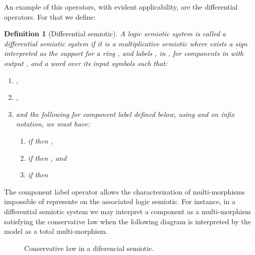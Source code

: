\documentclass[oribibl]{llncs}
\newtheorem{defn}{Definition}
\begin{document}
An example of this operators, with evident applicability, are the differential operators. For that we define:

\begin{defn}[Differential semiotic]
A logic semiotic system  is called a \emph{differential semiotic
system} if it is a multiplicative semiotic where exists a sign  interpreted as the support for a ring
, and labels , in , for components   in  with output , and  a word over its input symbols such that:
\begin{enumerate}
 \item ,
 \item ,
 \item and the following for component label defined below, using  and  on infix notation, we must have:
  \begin{enumerate}
    \item if  then ,
    \item if  then , and
    \item if  then 
  \end{enumerate}
\end{enumerate}
\end{defn}

The component label operator  allows the characterization of
multi-morphisms impossible of represente on the associated logic
semiotic. For instance, in a differential semiotic system we may interpret a component  as a
multi-morphism satisfying the conservative law when the following
diagram is interpreted by the model as a total multi-morphism.
\begin{figure}[h]

\caption{Conservative law in a diferencial semiotic.}\label{conservative}
\end{figure}
\end{document}
